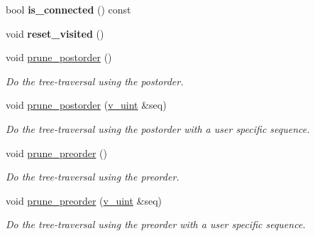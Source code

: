 \begin{DoxyCompactItemize}
\item 
bool {\bfseries is\+\_\+connected} () const \hypertarget{classTree_a9f911acd648bbae87eaa018e61289903}{}\label{classTree_a9f911acd648bbae87eaa018e61289903}

\item 
void {\bfseries reset\+\_\+visited} ()\hypertarget{classTree_adb83bb19c14623ce57ac6d1b84b1c2ff}{}\label{classTree_adb83bb19c14623ce57ac6d1b84b1c2ff}

\item 
void \hyperlink{classTree_a7d465880d18acf79f3a772ea5412b0d7}{prune\+\_\+postorder} ()
\begin{DoxyCompactList}\small\item\em Do the tree-\/traversal using the postorder. \end{DoxyCompactList}\item 
void \hyperlink{classTree_a8318027f3d2b1a07bf25e813c7c80056}{prune\+\_\+postorder} (\hyperlink{typedefs_8h_ad56dde311aef1af823f4351451e8a381}{v\+\_\+uint} \&seq)
\begin{DoxyCompactList}\small\item\em Do the tree-\/traversal using the postorder with a user specific sequence. \end{DoxyCompactList}\item 
void \hyperlink{classTree_ac85bfb083b3856e65987e1d15885a61c}{prune\+\_\+preorder} ()
\begin{DoxyCompactList}\small\item\em Do the tree-\/traversal using the preorder. \end{DoxyCompactList}\item 
void \hyperlink{classTree_a6841109c7ff37bcabdf3a4d79009ad21}{prune\+\_\+preorder} (\hyperlink{typedefs_8h_ad56dde311aef1af823f4351451e8a381}{v\+\_\+uint} \&seq)
\begin{DoxyCompactList}\small\item\em Do the tree-\/traversal using the preorder with a user specific sequence. \end{DoxyCompactList}\end{DoxyCompactItemize}
